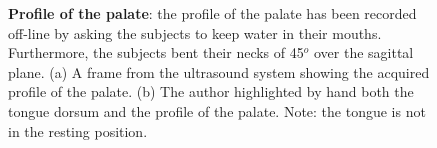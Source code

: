 \begin{figure}
  \centering
	\hspace{0.05\textwidth}

	\caption[Profile of the palate]
	{\textbf{Profile of the palate}: the profile of the palate has been recorded
	off-line by asking the subjects to keep water in their mouths.
	Furthermore, the subjects bent their necks of 45$^o$ over the sagittal
	plane.
	(a) A frame from the ultrasound system showing the acquired profile of the
	palate. (b) The author highlighted by hand both the tongue dorsum and the 
	profile of the palate. Note: the tongue is not in the resting position.}
	\label{fig:results:pal}
\end{figure}
